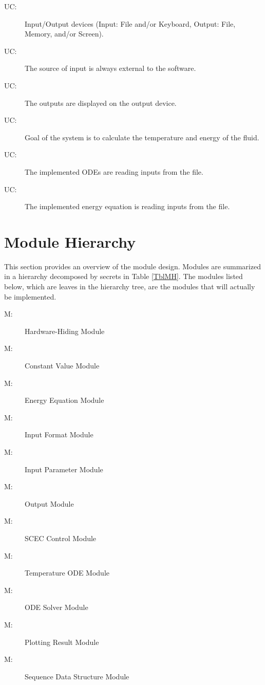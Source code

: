 \documentclass[12pt, titlepage]{article}
\newcounter{ucnum}
\newcommand{\uctheucnum}{UC\theucnum}
\newcounter{mnum}
\newcommand{\mthemnum}{M\themnum}
\begin{document}
\begin{description}
\item[ \uctheucnum \label{ucIO_1}:] Input/Output devices
  (Input: File and/or Keyboard, Output: File, Memory, and/or Screen).
\item[ \uctheucnum \label{ucInput_2}:] The source of input is always external to the software. 
\item[ \uctheucnum \label{ucOutput_3}:] The outputs are displayed on the output device. 
\item[ \uctheucnum \label{ucGoal_4}:] Goal of the system is to calculate the temperature and energy of the fluid.
\item[ \uctheucnum \label{ucOde_6}:] The implemented ODEs are reading inputs from the file. 
\item[ \uctheucnum \label{ucEnergy_7}:] The implemented energy equation is reading inputs from the file.  

\end{description}

\section{Module Hierarchy} \label{SecMH}

This section provides an overview of the module design. Modules are summarized
in a hierarchy decomposed by secrets in Table \ref{TblMH}. The modules listed
below, which are leaves in the hierarchy tree, are the modules that will
actually be implemented.

\begin{description}
\item [ \mthemnum \label{1_mHH}:] Hardware-Hiding Module
\item [ \mthemnum \label{2_mHH}:] Constant Value Module
\item [ \mthemnum \label{3_mHH}:] Energy Equation Module
\item [ \mthemnum \label{4_mHH}:] Input Format Module
\item [ \mthemnum \label{5_mHH}:] Input Parameter Module
\item [ \mthemnum \label{6_mHH}:] Output Module
\item [ \mthemnum \label{7_mHH}:] SCEC Control Module
\item [ \mthemnum \label{8_mHH}:] Temperature ODE Module
\item [ \mthemnum \label{9_mHH}:] ODE Solver Module
\item [ \mthemnum \label{10_mHH}:] Plotting Result Module
\item [ \mthemnum \label{12_mHH}:] Sequence Data Structure Module 

\end{description}
\end{document}
